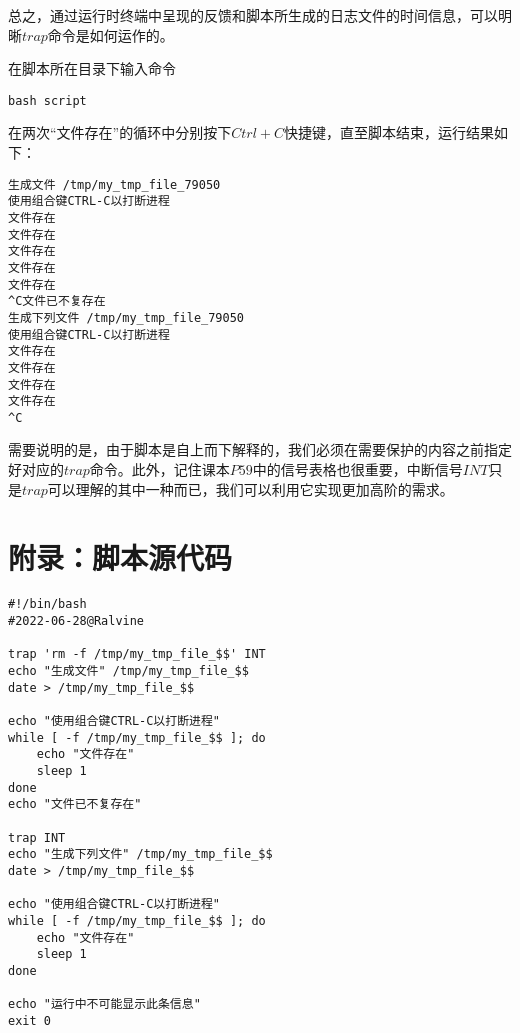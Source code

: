 \documentclass{ctexart}
\begin{document}
总之，通过运行时终端中呈现的反馈和脚本所生成的日志文件的时间信息，可以明晰$trap$命令是如何运作的。

在脚本所在目录下输入命令

\begin{verbatim}
bash script
\end{verbatim}

在两次“文件存在”的循环中分别按下$Ctrl+C$快捷键，直至脚本结束，运行结果如下：

\begin{verbatim}
生成文件 /tmp/my_tmp_file_79050
使用组合键CTRL-C以打断进程
文件存在
文件存在
文件存在
文件存在
文件存在
^C文件已不复存在
生成下列文件 /tmp/my_tmp_file_79050
使用组合键CTRL-C以打断进程
文件存在
文件存在
文件存在
文件存在
^C
\end{verbatim}

需要说明的是，由于脚本是自上而下解释的，我们必须在需要保护的内容之前指定好对应的$trap$命令。此外，记住课本$P59$中的信号表格也很重要，中断信号$INT$只是$trap$可以理解的其中一种而已，我们可以利用它实现更加高阶的需求。


\section*{附录：脚本源代码}

\begin{verbatim}
#!/bin/bash
#2022-06-28@Ralvine

trap 'rm -f /tmp/my_tmp_file_$$' INT
echo "生成文件" /tmp/my_tmp_file_$$
date > /tmp/my_tmp_file_$$

echo "使用组合键CTRL-C以打断进程"
while [ -f /tmp/my_tmp_file_$$ ]; do
	echo "文件存在"
	sleep 1
done
echo "文件已不复存在"

trap INT
echo "生成下列文件" /tmp/my_tmp_file_$$
date > /tmp/my_tmp_file_$$

echo "使用组合键CTRL-C以打断进程"
while [ -f /tmp/my_tmp_file_$$ ]; do
	echo "文件存在"
	sleep 1
done

echo "运行中不可能显示此条信息"
exit 0
\end{verbatim}
\end{document}
